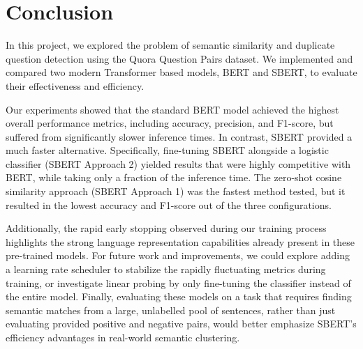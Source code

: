 \section{Conclusion}

In this project, we explored the problem of semantic similarity and duplicate question detection using the Quora Question Pairs dataset. We implemented and compared two modern Transformer based models, BERT and SBERT, to evaluate their effectiveness and efficiency.

Our experiments showed that the standard BERT model achieved the highest overall performance metrics, including accuracy, precision, and F1-score, but suffered from significantly slower inference times. In contrast, SBERT provided a much faster alternative. Specifically, fine-tuning SBERT alongside a logistic classifier (SBERT Approach 2) yielded results that were highly competitive with BERT, while taking only a fraction of the inference time. The zero-shot cosine similarity approach (SBERT Approach 1) was the fastest method tested, but it resulted in the lowest accuracy and F1-score out of the three configurations.

Additionally, the rapid early stopping observed during our training process highlights the strong language representation capabilities already present in these pre-trained models. For future work and improvements, we could explore adding a learning rate scheduler to stabilize the rapidly fluctuating metrics during training, or investigate linear probing by only fine-tuning the classifier instead of the entire model. Finally, evaluating these models on a task that requires finding semantic matches from a large, unlabelled pool of sentences, rather than just evaluating provided positive and negative pairs, would better emphasize SBERT's efficiency advantages in real-world semantic clustering.